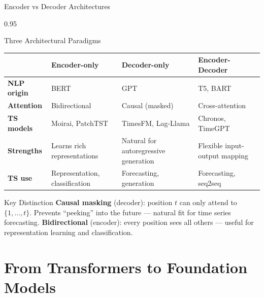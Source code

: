 \documentclass[9pt, aspectratio=169, t]{beamer}
\begin{document}
\begin{frame}{Encoder vs Decoder Architectures}
    \begin{cminipage}{0.95\textwidth}
    \vspace{-2mm}
    {\footnotesize
    \begin{block}{Three Architectural Paradigms}
    \vspace{-2mm}
    \begin{center}
    \begin{tabular}{l|p{3cm}|p{3cm}|p{3.5cm}}
        \toprule
        & \textbf{Encoder-only} & \textbf{Decoder-only} & \textbf{Encoder-Decoder} \\
        \midrule
        \textbf{NLP origin} & BERT & GPT & T5, BART \\
        \textbf{Attention} & Bidirectional & Causal (masked) & Cross-attention \\
        \textbf{TS models} & Moirai, PatchTST & TimesFM, Lag-Llama & Chronos, TimeGPT \\
        \textbf{Strengths} & Learns rich representations & Natural for autoregressive generation & Flexible input-output mapping \\
        \textbf{TS use} & Representation, classification & Forecasting, generation & Forecasting, seq2seq \\
        \bottomrule
    \end{tabular}
    \end{center}
    \vspace{-2mm}
    \end{block}
    }
    \vspace{-2mm}
    \begin{exampleblock}{Key Distinction}
        {\small \textbf{Causal masking} (decoder): position $t$ can only attend to $\{1, \ldots, t\}$. Prevents ``peeking'' into the future --- natural fit for time series forecasting. \textbf{Bidirectional} (encoder): every position sees all others --- useful for representation learning and classification.}
    \end{exampleblock}
    \end{cminipage}
\end{frame}

\section{From Transformers to Foundation Models}
\end{document}
